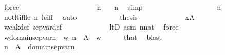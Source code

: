 \begin{isabellebody}
\ force\isanewline
\ \ \ \ \ \ \ \ \isamarkupfalse%
\ \isanewline
\ \ \ \ \ \ \ \ \isamarkupfalse%
\ {\isachardoublequoteopen}{\isasymnot}\ n\ {\isacharless}{\kern0pt}{}{\isachardoublequoteclose}\ \isamarkupfalse%
\ {\isacartoucheopen}n{\isasymnoteq}{}{\isacartoucheclose}\ \isamarkupfalse%
\ simp\isanewline
\ \ \ \ \ \ \ \ \isamarkupfalse%
\ \isanewline
\ \ \ \ \ \ \ \ \isamarkupfalse%
\ {\isachardoublequoteopen}n{\isacharequal}{\kern0pt}{}{\isachardoublequoteclose}\ \isamarkupfalse%
\ not{\isacharunderscore}{\kern0pt}lt{\isacharunderscore}{\kern0pt}iff{\isacharunderscore}{\kern0pt}le\ {\isacartoucheopen}n{\isacharless}{\kern0pt}{}{\isacartoucheclose}\ le{\isacharunderscore}{\kern0pt}iff\ \isamarkupfalse%
\ auto\isanewline
\ \ \ \ \ \ \ \ \isamarkupfalse%
\ \isamarkupfalse%
\ {\isacharquery}{\kern0pt}thesis\ \isanewline
\ \ \ \ \ \ \ \ \ \ \isamarkupfalse%
\ {\isacartoucheopen}x{\isasymnotin}{\isacharquery}{\kern0pt}A{\isacartoucheclose}\ \isanewline
\ \ \ \ \ \ \ \ \ \ \isamarkupfalse%
\ weak{\isacharunderscore}{\kern0pt}def\ sep{\isacharunderscore}{\kern0pt}var{\isacharunderscore}{\kern0pt}def\ \isanewline
\ \ \ \ \ \ \ \ \ \ \isamarkupfalse%
\ ltD\ asm\ {\isacartoucheopen}n{\isasymin}nat{\isacartoucheclose}\ \isamarkupfalse%
\ force\isanewline
\ \ \ \ \ \ \isamarkupfalse%
\isanewline
\ \ \ \ \isamarkupfalse%
\isanewline
\ \ \isacommand{{\isacharbraceright}{\kern0pt}}\isamarkupfalse%
\isanewline
\ \ \isamarkupfalse%
\isanewline
\ \ \isamarkupfalse%
\ {\isachardoublequoteopen}w{\isasymin}domain{\isacharparenleft}{\kern0pt}sep{\isacharunderscore}{\kern0pt}var{\isacharparenleft}{\kern0pt}n{\isacharparenright}{\kern0pt}{\isacharparenright}{\kern0pt}{\isachardoublequoteclose}\ \ {\isachardoublequoteopen}w{\isasymin}\ {}{\isacharhash}{\kern0pt}{\isacharplus}{\kern0pt}n\ {\isacharminus}{\kern0pt}\ {\isacharquery}{\kern0pt}A{\isachardoublequoteclose}\ \ w\isanewline
\ \ \ \ \isamarkupfalse%
\ that\ \isamarkupfalse%
\ blast\isanewline
\ \ \isamarkupfalse%
\isanewline
\ \ \isamarkupfalse%
\ {\isachardoublequoteopen}{}{\isacharhash}{\kern0pt}{\isacharplus}{\kern0pt}n\ {\isacharminus}{\kern0pt}\ {\isacharquery}{\kern0pt}A\ {\isasymsubseteq}\ domain{\isacharparenleft}{\kern0pt}sep{\isacharunderscore}{\kern0pt}var{\isacharparenleft}{\kern0pt}n{\isacharparenright}{\kern0pt}{\isacharparenright}{\kern0pt}{\isachardoublequoteclose}\ \isamarkupfalse%

\end{isabellebody}
